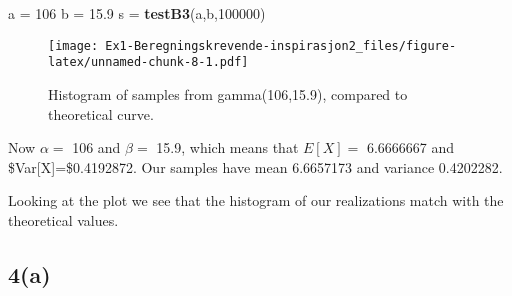 \documentclass[
]{article}
\newenvironment{Shaded}{\begin{snugshade}}{\end{snugshade}}
\newcommand{\DecValTok}[1]{\textcolor[rgb]{0.00,0.00,0.81}{#1}}
\newcommand{\FloatTok}[1]{\textcolor[rgb]{0.00,0.00,0.81}{#1}}
\newcommand{\KeywordTok}[1]{\textcolor[rgb]{0.13,0.29,0.53}{\textbf{#1}}}
\newcommand{\NormalTok}[1]{#1}
\newcommand{\StringTok}[1]{\textcolor[rgb]{0.31,0.60,0.02}{#1}}
\begin{document}
\begin{Shaded}
\begin{Highlighting}[]
\NormalTok{a =}\StringTok{ }\DecValTok{106}
\NormalTok{b =}\StringTok{ }\FloatTok{15.9}
\NormalTok{s =}\StringTok{ }\KeywordTok{testB3}\NormalTok{(a,b,}\DecValTok{100000}\NormalTok{)}
\end{Highlighting}
\end{Shaded}

\begin{figure}
\centering
\texttt{[image: Ex1-Beregningskrevende-inspirasjon2\_files/figure-latex/unnamed-chunk-8-1.pdf]}
\caption{Histogram of samples from gamma(106,15.9), compared to
theoretical curve.}
\end{figure}

Now \(\alpha =\) 106 and \(\beta=\) 15.9, which means that \(E[X]=\)
6.6666667 and \$Var{[}X{]}=\$0.4192872. Our samples have mean 6.6657173
and variance 0.4202282.

Looking at the plot we see that the histogram of our realizations match
with the theoretical values.

\hypertarget{a-4}{%
\subsection{4(a)}\label{a-4}}
\end{document}
